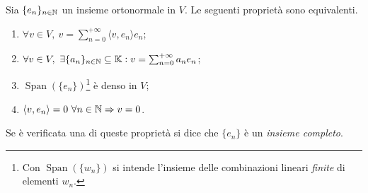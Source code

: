 \begin{proposition}
    Sia $ \{e_n\}_{n \in \mathbb{N}} $ un insieme ortonormale in $ V $. Le seguenti proprietà sono equivalenti. 
    \begin{enumerate}[label=(\roman*)]
        \item $ \forall v \in V, \ v = \sum_{n = 0}^{+\infty} {\langle v, e_n \rangle} e_n $;
        \item $ \forall v \in V, \ \exists \{a_n\}_{n \in \mathbb{N}} \subseteq \mathbb{K} : v = \sum_{n = 0}^{+\infty} a_n e_n $;
        \item $ \operatorname{Span}{(\{e_n\})} $\footnote{Con $ \operatorname{Span}{(\{w_n\})} $ si intende l'insieme delle combinazioni lineari \emph{finite} di elementi $ w_n $.} è denso in $ V $;
        \item $ {\langle v, e_n \rangle} = 0 \ \forall n \in \mathbb{N} \Rightarrow v = 0 $.
    \end{enumerate}
    Se è verificata una di queste proprietà si dice che $ \{e_n\} $ è un \emph{insieme completo}.
\end{proposition}
